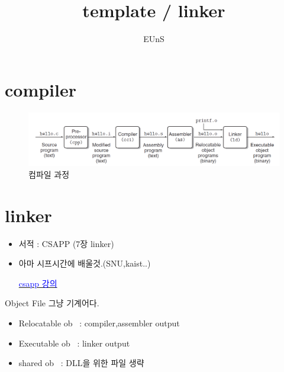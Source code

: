 \documentclass[10pt]{beamer}
\title{template / linker}
\author{EUnS}
\begin{document}

\begin{frame}{}
    \maketitle
\end{frame}    

\begin{frame}{}
    \tableofcontents
\end{frame}   


\section{compiler}

\begin{frame}
    \begin{figure}[h!]
        \centering
        \includegraphics[scale=0.25]{pic1.PNG}
        \caption{컴파일 과정}
    \end{figure}
\end{frame}    

\section{linker}

\begin{frame}
    \begin{itemize}
        \item 서적 : CSAPP (7장 linker)
        \item 아마 시프시간에 배울것.(SNU,kaist..)
        
        \href{http://www.cs.cmu.edu/afs/cs/academic/class/15213-f15/www/schedule.html}{\textcolor{blue}{csapp 강의}}
        
    \end{itemize}
\end{frame}


\begin{frame}{Object File}
    그냥 기계어다.
    \begin{itemize}
        \item Relocatable ob~ : compiler,assembler output
        \item Executable ob~ : linker output
        \item shared ob~ : DLL을 위한 파일 생략
    \end{itemize}
\end{frame}    
\end{document}
